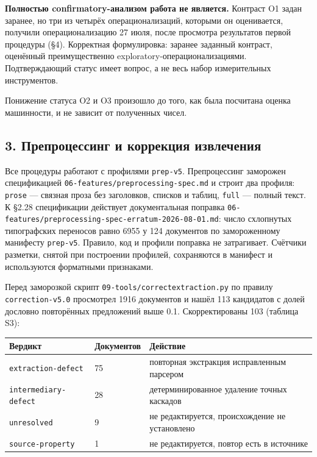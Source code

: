 \documentclass[11pt,a4paper]{article}
\renewcommand{\_}{\textunderscore\allowbreak}
\begin{document}
\textbf{Полностью confirmatory-анализом работа не является.} Контраст O1 задан заранее,
но три из четырёх операционализаций, которыми он оценивается, получили
операционализацию 27 июля, после просмотра результатов первой процедуры (§4).
Корректная формулировка: заранее заданный контраст, оценённый преимущественно
exploratory-операционализациями. Подтверждающий статус имеет вопрос, а не весь
набор измерительных инструментов.

Понижение статуса O2 и O3 произошло до того, как была посчитана оценка
машинности, и не зависит от полученных чисел.

\subsection{3. Препроцессинг и коррекция извлечения}

Все процедуры работают с профилями \texttt{prep-\allowbreak{}v5}. Препроцессинг заморожен
спецификацией \texttt{06-\allowbreak{}features/preprocessing-\allowbreak{}spec.md} и строит два профиля: \texttt{prose} —
связная проза без заголовков, списков и таблиц, \texttt{full} — полный текст. К §2.28
спецификации действует документальная поправка
\texttt{06-\allowbreak{}features/preprocessing-\allowbreak{}spec-\allowbreak{}erratum-\allowbreak{}2026-\allowbreak{}08-\allowbreak{}01.md}: число схлопнутых
типографских переносов равно 6955 у 124 документов по замороженному манифесту
\texttt{prep-\allowbreak{}v5}. Правило, код и профили поправка не затрагивает. Счётчики
разметки, снятой при построении профилей, сохраняются в манифест и используются
форматными признаками.

Перед заморозкой скрипт \texttt{09-\allowbreak{}tools/correct\_extraction.py} по правилу
\texttt{correction-\allowbreak{}v5.0} просмотрел 1916 документов и нашёл 113 кандидатов с долей
дословно повторённых предложений выше 0.1. Скорректированы 103 (таблица S3):

\begin{center}
\small
\begin{tabularx}{\textwidth}{llX}
\toprule
Вердикт & Документов & Действие \\
\midrule
\texttt{extraction-\allowbreak{}defect} & 75 & повторная экстракция исправленным парсером \\
\texttt{intermediary-\allowbreak{}defect} & 28 & детерминированное удаление точных каскадов \\
\texttt{unresolved} & 9 & не редактируется, происхождение не установлено \\
\texttt{source-\allowbreak{}property} & 1 & не редактируется, повтор есть в источнике \\
\bottomrule
\end{tabularx}
\end{center}
\end{document}
